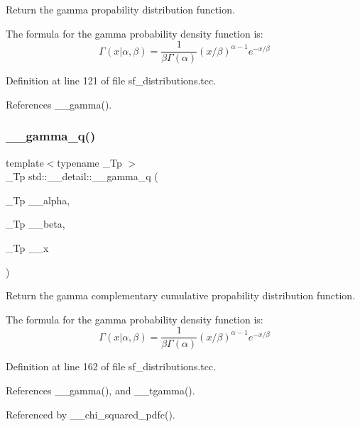 Return the gamma propability distribution function. 

The formula for the gamma probability density function is\+: \[ \Gamma(x|\alpha,\beta) = \frac{1}{\beta\Gamma(\alpha)} (x/\beta)^{\alpha - 1} e^{-x/\beta} \] 

Definition at line 121 of file sf\+\_\+distributions.\+tcc.



References \+\_\+\+\_\+gamma().

\mbox{\label{namespacestd_1_1____detail_ad979441c8b26be7cfddb93db911743eb}} 
\subsubsection{\texorpdfstring{\+\_\+\+\_\+gamma\+\_\+q()}{\_\_gamma\_q()}\hspace{0.1cm}{\footnotesize\ttfamily [1/2]}}
{\footnotesize\ttfamily template$<$typename \+\_\+\+Tp $>$ \\
\+\_\+\+Tp std\+::\+\_\+\+\_\+detail\+::\+\_\+\+\_\+gamma\+\_\+q (\begin{DoxyParamCaption}\item[{\+\_\+\+Tp}]{\+\_\+\+\_\+alpha,  }\item[{\+\_\+\+Tp}]{\+\_\+\+\_\+beta,  }\item[{\+\_\+\+Tp}]{\+\_\+\+\_\+x }\end{DoxyParamCaption})}



Return the gamma complementary cumulative propability distribution function. 

The formula for the gamma probability density function is\+: \[ \Gamma(x|\alpha,\beta) = \frac{1}{\beta\Gamma(\alpha)} (x/\beta)^{\alpha - 1} e^{-x/\beta} \] 

Definition at line 162 of file sf\+\_\+distributions.\+tcc.



References \+\_\+\+\_\+gamma(), and \+\_\+\+\_\+tgamma().



Referenced by \+\_\+\+\_\+chi\+\_\+squared\+\_\+pdfc().

\mbox{\label{namespacestd_1_1____detail_a0ac19486073d0a7b2dc923b45b26777c}} 
